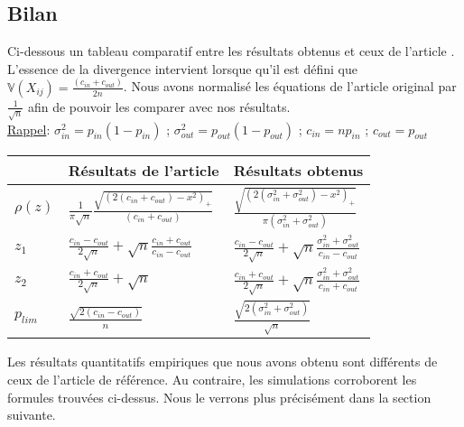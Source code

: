 \subsection{Bilan}
Ci-dessous un tableau comparatif entre les résultats obtenus et ceux de l'article \cite{raj_rao}.
L'essence de la divergence intervient lorsque qu'il est défini que $\mathbb{V}(X_{ij}) = \frac{(c_{in} + c_{out})}{2n}$.
Nous avons normalisé les équations de l'article original par $\frac{1}{\sqrt{n}}$ afin de pouvoir les comparer avec nos résultats.\\
\underline{Rappel}: $\sigma_{in}^2=p_{in}(1-p_{in})$ ; $\sigma_{out}^2=p_{out}(1-p_{out})$ ; $c_{in} = np_{in}$ ; $c_{out} = p_{out}$

\renewcommand{\arraystretch}{2}
\begin{table}[h] 
	\label{tab:bilan}
	\centering
    \begin{tabular}{|l|l|l|}
    \hline
      &  Résultats de l'article  &  Résultats obtenus \\ \hline
    $\rho (z)$  &  $\frac{1}{\pi\sqrt{n}}\frac{\sqrt{(2(c_{in} + c_{out}) - x^2)_+}}{(c_{in} + c_{out})}$&  $\frac{\sqrt{(2(\sigma_{in}^2 + \sigma_{out}^2) - x^2)_+}}{\pi(\sigma_{in}^2 + \sigma_{out}^2)}$\\ \hline
    $z_1$&  $\frac{c_{in}-c_{out}}{2\sqrt{n}} + \sqrt{n}\frac{c_{in}+c_{out}}{c_{in}-c_{out}}$ &  $\frac{c_{in}-c_{out}}{2\sqrt{n}} + \sqrt{n}\frac{\sigma_{in}^2+\sigma_{out}^2}{c_{in}-c_{out}}$\\ \hline
    $z_2$&  $\frac{c_{in}+c_{out}}{2\sqrt{n}} + \sqrt{n}$ &  $\frac{c_{in}+c_{out}}{2\sqrt{n}} + \sqrt{n}\frac{\sigma_{in}^2+\sigma_{out}^2}{c_{in}+c_{out}}$\\ \hline
    $p_{lim}$&  $\frac{\sqrt{2(c_{in} - c_{out})}}{n}$ &  $\frac{\sqrt{2(\sigma_{in}^2 + \sigma_{out}^2)}}{\sqrt{n}}$\\ \hline
    \end{tabular}
\end{table}

Les résultats quantitatifs empiriques que nous avons obtenu sont différents de ceux de l'article de référence.
Au contraire, les simulations corroborent les formules trouvées ci-dessus.
Nous le verrons plus précisément dans la section suivante.   
